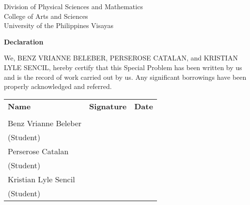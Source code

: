 \begin{center}
	Division of Physical Sciences and Mathematics\\
	College of Arts and Sciences\\
	University of the Philippines Visayas 
	
	\textbf{Declaration}
\end{center}

We,  {BENZ VRIANNE BELEBER}, {PERSEROSE CATALAN}, and {KRISTIAN LYLE SENCIL}, hereby certify that this Special Problem has been written by us  and is the record of work carried out by us. Any significant borrowings have been properly acknowledged and referred.

\begin{tabular}{lll}
	\bfseries Name  & \bfseries Signature & \bfseries Date\\ \\
	Benz Vrianne Beleber &\signaturerule  & \signaturerule\\ 
	\multicolumn{1}{l}{(Student)} \\ 
	Perserose Catalan &\signaturerule  & \signaturerule\\ 
	\multicolumn{1}{l}{(Student)} \\
	Kristian Lyle Sencil &\signaturerule  & \signaturerule\\ 
	\multicolumn{1}{l}{(Student)} \\
	
\end{tabular}
